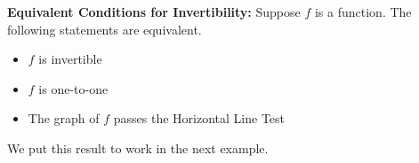 \colorbox{ResultColor}{\bbm

\begin{thm} \label{inversefunctionequivalency} \textbf{Equivalent Conditions for Invertibility:} Suppose $f$ is a function.  The following statements are equivalent. 

\vspace{-.1in}

\begin{itemize}

\item  $f$ is invertible

\item $f$ is one-to-one

\item  The graph of $f$ passes the Horizontal Line Test

\end{itemize}

\end{thm}
\ebm}

\medskip

We put this result to work in the next example.

